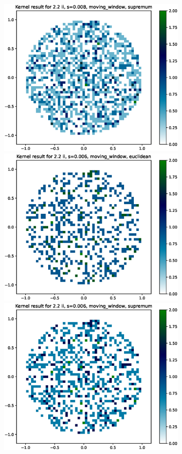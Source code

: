 \documentclass{article}
\begin{document}
\includegraphics[height=8cm]{comparisons//Kernel_result_2-2ii_s_0-008_moving_window_supremum.eps} \vspace*{-3em} \\
\hspace*{-1.5cm}\includegraphics[height=8cm]{comparisons//Kernel_result_2-2ii_s_0-006_moving_window_euclidean.eps} \hspace*{-1.5cm}
\includegraphics[height=8cm]{comparisons//Kernel_result_2-2ii_s_0-006_moving_window_supremum.eps} \vspace*{-2em} \\
\end{document}
